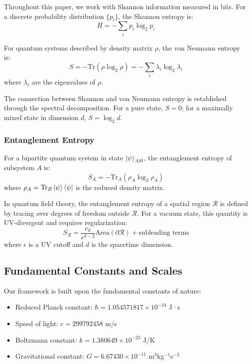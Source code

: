 \documentclass[11pt,a4paper]{article}
\theoremstyle{plain}
\theoremstyle{definition}
\theoremstyle{remark}
\begin{document}
Throughout this paper, we work with Shannon information measured in bits. For a discrete probability distribution $\{p_i\}$, the Shannon entropy is:
\begin{equation}
H = -\sum_i p_i \log_2 p_i
\end{equation}

For quantum systems described by density matrix $\rho$, the von Neumann entropy is:
\begin{equation}
S = -\text{Tr}(\rho\log_2\rho) = -\sum_i\lambda_i\log_2\lambda_i
\end{equation}
where $\lambda_i$ are the eigenvalues of $\rho$.

The connection between Shannon and von Neumann entropy is established through the spectral decomposition. For a pure state, $S=0$; for a maximally mixed state in dimension $d$, $S=\log_2 d$.

\subsubsection{Entanglement Entropy}

For a bipartite quantum system in state $\ket{\psi}_{AB}$, the entanglement entropy of subsystem $A$ is:
\begin{equation}
S_A = -\text{Tr}_A(\rho_A\log_2\rho_A)
\end{equation}
where $\rho_A = \text{Tr}_B\ket{\psi}\bra{\psi}$ is the reduced density matrix.

In quantum field theory, the entanglement entropy of a spatial region $\mathcal{R}$ is defined by tracing over degrees of freedom outside $\mathcal{R}$. For a vacuum state, this quantity is UV-divergent and requires regularization:
\begin{equation}
S_{\mathcal{R}} = \frac{c_d}{\epsilon^{d-2}}\text{Area}(\partial\mathcal{R}) + \text{subleading terms}
\end{equation}
where $\epsilon$ is a UV cutoff and $d$ is the spacetime dimension.

\subsection{Fundamental Constants and Scales}

Our framework is built upon the fundamental constants of nature:

\begin{itemize}[leftmargin=*]
\item Reduced Planck constant: $\hbar = 1.054571817\times 10^{-34}$ J·s
\item Speed of light: $c = 299792458$ m/s
\item Boltzmann constant: $k = 1.380649\times 10^{-23}$ J/K
\item Gravitational constant: $G = 6.67430\times 10^{-11}$ m$^3$kg$^{-1}$s$^{-2}$
\end{itemize}
\end{document}
